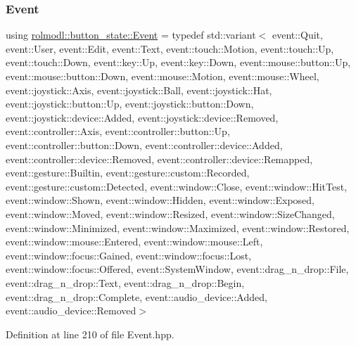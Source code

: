 \subsubsection{\texorpdfstring{Event}{Event}}
{\footnotesize\ttfamily using \mbox{\hyperlink{namespacerolmodl_1_1button__state_aef4672e4b037d3f04e71d731caf34aa9}{rolmodl\+::button\+\_\+state\+::\+Event}} = typedef std\+::variant$<$ event\+::\+Quit, event\+::\+User, event\+::\+Edit, event\+::\+Text, event\+::touch\+::\+Motion, event\+::touch\+::\+Up, event\+::touch\+::\+Down, event\+::key\+::\+Up, event\+::key\+::\+Down, event\+::mouse\+::button\+::\+Up, event\+::mouse\+::button\+::\+Down, event\+::mouse\+::\+Motion, event\+::mouse\+::\+Wheel, event\+::joystick\+::\+Axis, event\+::joystick\+::\+Ball, event\+::joystick\+::\+Hat, event\+::joystick\+::button\+::\+Up, event\+::joystick\+::button\+::\+Down, event\+::joystick\+::device\+::\+Added, event\+::joystick\+::device\+::\+Removed, event\+::controller\+::\+Axis, event\+::controller\+::button\+::\+Up, event\+::controller\+::button\+::\+Down, event\+::controller\+::device\+::\+Added, event\+::controller\+::device\+::\+Removed, event\+::controller\+::device\+::\+Remapped, event\+::gesture\+::\+Builtin, event\+::gesture\+::custom\+::\+Recorded, event\+::gesture\+::custom\+::\+Detected, event\+::window\+::\+Close, event\+::window\+::\+Hit\+Test, event\+::window\+::\+Shown, event\+::window\+::\+Hidden, event\+::window\+::\+Exposed, event\+::window\+::\+Moved, event\+::window\+::\+Resized, event\+::window\+::\+Size\+Changed, event\+::window\+::\+Minimized, event\+::window\+::\+Maximized, event\+::window\+::\+Restored, event\+::window\+::mouse\+::\+Entered, event\+::window\+::mouse\+::\+Left, event\+::window\+::focus\+::\+Gained, event\+::window\+::focus\+::\+Lost, event\+::window\+::focus\+::\+Offered, event\+::\+System\+Window, event\+::drag\+\_\+n\+\_\+drop\+::\+File, event\+::drag\+\_\+n\+\_\+drop\+::\+Text, event\+::drag\+\_\+n\+\_\+drop\+::\+Begin, event\+::drag\+\_\+n\+\_\+drop\+::\+Complete, event\+::audio\+\_\+device\+::\+Added, event\+::audio\+\_\+device\+::\+Removed$>$}



Definition at line 210 of file Event.\+hpp.

